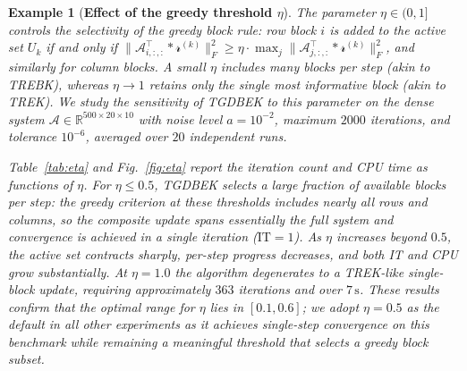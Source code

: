 \documentclass[11pt]{article}
\newtheorem{example}[theorem]{Example}
\def\fm#1{\mathcal{#1}}
\begin{document}
\begin{example}[\textbf{Effect of the greedy threshold $\eta$}] \label{ex:eta}
The parameter $\eta \in (0,1]$ controls the selectivity of the greedy block rule: row block $i$ is added to the active set $U_k$ if and only if $\|\fm A_{i,:,:}^\top * \fm r^{(k)}\|_F^2 \geq \eta \cdot \max_j \|\fm A_{j,:,:}^\top * \fm r^{(k)}\|_F^2$, and similarly for column blocks. A small $\eta$ includes many blocks per step (akin to TREBK), whereas $\eta \to 1$ retains only the single most informative block (akin to TREK). We study the sensitivity of TGDBEK to this parameter on the dense system $\fm A \in \mathbb{R}^{500\times20\times10}$ with noise level $a=10^{-2}$, maximum $2000$ iterations, and tolerance $10^{-6}$, averaged over $20$ independent runs.

Table~\ref{tab:eta} and Fig.~\ref{fig:eta} report the iteration count and CPU time as functions of $\eta$. For $\eta \leq 0.5$, TGDBEK selects a large fraction of available blocks per step: the greedy criterion at these thresholds includes nearly all rows and columns, so the composite update spans essentially the full system and convergence is achieved in a single iteration ($\mathrm{IT}=1$). As $\eta$ increases beyond $0.5$, the active set contracts sharply, per-step progress decreases, and both IT and CPU grow substantially. At $\eta = 1.0$ the algorithm degenerates to a TREK-like single-block update, requiring approximately $363$ iterations and over $7\,\mathrm{s}$. These results confirm that the optimal range for $\eta$ lies in $[0.1, 0.6]$; we adopt $\eta = 0.5$ as the default in all other experiments as it achieves single-step convergence on this benchmark while remaining a meaningful threshold that selects a greedy block subset.


\end{example}
\end{document}
